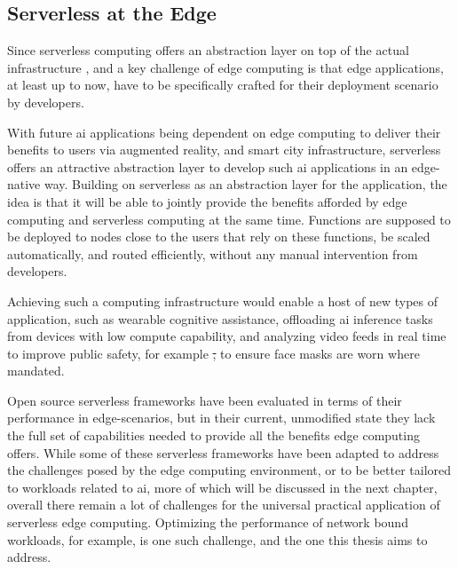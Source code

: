 \documentclass[draft,final]{vutinfth} %
\providecommand{\DIFdeltex}[1]{{\protect\color{red}\sout{#1}}}                      %
\providecommand{\DIFdelbegin}{} %
\providecommand{\DIFdelend}{} %
\providecommand{\DIFdel}[1]{\texorpdfstring{\DIFdeltex{#1}}{}} %
\begin{document}
\subsection{Serverless at the Edge}
Since serverless computing offers an abstraction layer on top of the actual infrastructure \cite{jonasCloudProgrammingSimplified2019}, and a key challenge of edge computing is that edge applications, at least up to now, have to be specifically crafted for their deployment scenario by developers\cite{shiPromiseEdgeComputing2016}.

With future \gls{ai} applications being dependent on edge computing to deliver their benefits to users via augmented reality, and smart city infrastructure\cite{rauschEdgeIntelligenceConvergence2019}, serverless offers an attractive abstraction layer to develop such \gls{ai} applications in an edge-native way.
Building on serverless as an abstraction layer for the application, the idea is that it will be able to jointly provide the benefits afforded by edge computing and serverless computing at the same time.
Functions are supposed to be deployed to nodes close to the users that rely on these functions, be scaled automatically, and routed efficiently, without any manual intervention from developers.

Achieving such a computing infrastructure would enable a host of new types of application, such as wearable cognitive assistance\cite{haWearableCognitiveAssistance2014}\cite{rauschPlatformSmartCityScale2021}, offloading \gls{ai} inference tasks from devices with low compute capability\cite{liEdgeAIOnDemand2020}, and analyzing video feeds in real time to improve public safety\cite{zhangEdgeVideoAnalytics2019}, for example \DIFdelbegin \DIFdel{, }\DIFdelend to ensure face masks are worn where mandated\cite{wangWearMaskFastInbrowser2021}.

Open source serverless frameworks have been evaluated in terms of their performance in edge-scenarios, but in their current, unmodified state they lack the full set of capabilities needed to provide all the benefits edge computing offers\cite{paladeEvaluationOpenSource2019}.
While some of these serverless frameworks have been adapted to address the challenges posed by the edge computing environment, or to be better tailored to workloads related to \gls{ai}\cite{rauschServerlessPlatformEdge}, more of which will be discussed in the next chapter, overall there remain a lot of challenges for the universal practical application of serverless edge computing\cite{aslanpourServerlessEdgeComputing2021}.
Optimizing the performance of network bound workloads, for example, is one such challenge\cite{skippy}, and the one this thesis aims to address.
\end{document}
